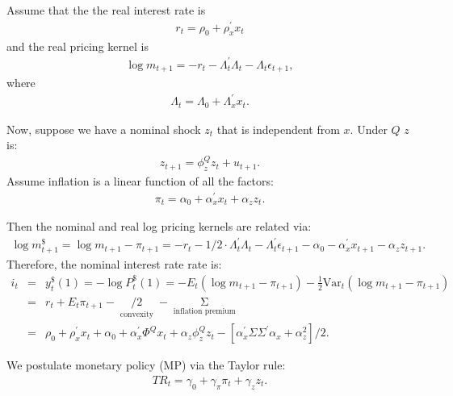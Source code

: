 \documentclass[11pt]{article}
\def\stackunder#1#2{\mathrel{\mathop{#2}\limits_{#1}}}
\begin{document}
Assume that the the real interest rate is
\begin{eqnarray}
     r_t=\rho_0 +  \rho_x^{\prime} x_t
\end{eqnarray}
and the real pricing kernel is
\begin{eqnarray}
     \log m_{t+1} = -r_t - \Lambda_t^{\prime}\Lambda_t - \Lambda_t  \epsilon_{t+1},
\end{eqnarray}
where
\begin{eqnarray}
    \Lambda_t = \Lambda_0+\Lambda_x^{\prime} x_t.
\end{eqnarray}

Now, suppose we have a nominal shock $z_t$ that is independent from $x.$ Under $Q$ $z$ is:
\begin{eqnarray}
    z_{t+1}=\phi_z^Q z_t+u_{t+1}.
\end{eqnarray}
Assume inflation is a linear function of all the factors:
\begin{eqnarray}
      \pi_t=\alpha_0+\alpha_x^{\prime}x_t+\alpha_z z_t.
\end{eqnarray}

Then the nominal and real log pricing kernels are related via:
\begin{eqnarray}
    \log m_{t+1}^{\$}=\log m_{t+1} - \pi_{t+1} = - r_t - 1/2 \cdot \Lambda_t^{\prime} \Lambda_t - \Lambda_t^{\prime} \epsilon_{t+1} - \alpha_0 - \alpha_x^{\prime} x_{t+1} - \alpha_z z_{t+1}.
\end{eqnarray}
Therefore, the nominal interest rate rate is:
\begin{eqnarray}
    i_t&=&y^{\$}_t(1)=-\log P^{\$}_t(1) = -E_t(\log m_{t+1}-\pi_{t+1})-\frac{1}{2}\mbox{Var}_t(\log m_{t+1}-\pi_{t+1})\nonumber \\
    &=&r_t+E_t{\pi_{t+1}} -\stackunder{\mbox{convexity}}{ [ \alpha_x^{\prime} \Sigma \Sigma^{\prime} \alpha_x+\alpha_z^2]/2} - \stackunder{\mbox{inflation premium}}{\alpha_x^{\prime} \Sigma \Lambda_t} \nonumber \\
    & = & \rho_0 +  \rho_x^{\prime} x_t + \alpha_0+\alpha_x^{\prime}\Phi^Q x_t + \alpha_z \phi_z^Q  z_t- [ \alpha_x^{\prime} \Sigma \Sigma^{\prime} \alpha_x+\alpha_z^2]/2.
\end{eqnarray}


We postulate monetary policy (MP) via the Taylor rule:
\begin{eqnarray}
      TR_t = \gamma_0 + \gamma_{\pi} \pi_t +\gamma_z z_t.
 \end{eqnarray}
\end{document}

